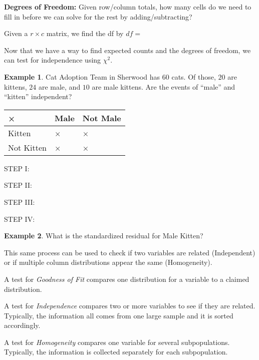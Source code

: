 \documentclass[12pt]{amsart}
\theoremstyle{definition}
\newtheorem{ex}{Example}
\begin{document}
\noindent\textbf{Degrees of Freedom:} Given row/column totals, how many cells do we need to fill in before we can solve for the rest by adding/subtracting?

\vfill
\begin{framed}
 Given a $r\times c$ matrix, we find the df by $df=$
 \vspace{0.1in}
\end{framed}
\newpage
\noindent Now that we have a way to find expected counts and the degrees of freedom, we can test for independence using $\chi^2$.
 \begin{ex} Cat Adoption Team in Sherwood has $60$ cats. Of those, $20$ are kittens, $24$ are male, and $10$ are male kittens. Are the events of ``male'' and ``kitten'' independent?

\vspace{.2in}

\begin{center}
\begin{tabular}{l|l|l|}
× & Male & Not Male\\\hline
Kitten & × & ×\\\hline
Not Kitten & × & ×\\\hline
\end{tabular}
\end{center}
\end{ex}

\vspace{0.1in}

\noindent STEP I:
\vspace{0.2in}

\noindent STEP II:
\vfill

\noindent STEP III:
\vfill

\noindent STEP IV:
\vspace{0.5in}

\begin{ex} What is the standardized residual for Male Kitten?\end{ex}
\vspace{0.5in}
\newpage
\noindent This same process can be used to check if two variables are related (Independent) or if multiple column distributions appear the same (Homogeneity).
\begin{framed}
A test for \emph{Goodness of Fit} compares one distribution for a variable to a claimed distribution.

A test for \emph{Independence} compares two or more variables to see if they are related. Typically, the information all comes from one large sample and it is sorted accordingly.

A test for \emph{Homogeneity} compares one variable for several subpopulations. Typically, the information is collected separately for each subpopulation.
\end{framed}
\end{document}
